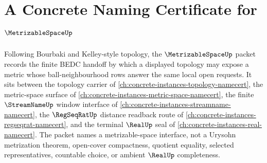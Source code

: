\chapter{A Concrete Naming Certificate for $\MetrizableSpaceUp$}
\label{ch:concrete-instances-metrizable-space-namecert}

Following Bourbaki and Kelley-style topology, the $\MetrizableSpaceUp$ packet records the finite BEDC handoff by which a displayed topology may expose a metric whose ball-neighbourhood rows answer the same local open requests. It sits between the topology carrier of \autoref{ch:concrete-instances-topology-namecert}, the metric-space surface of \autoref{ch:concrete-instances-metric-space-namecert}, the finite $\StreamNameUp$ window interface of \autoref{ch:concrete-instances-streamname-namecert}, the $\RegSeqRatUp$ distance readback route of \autoref{ch:concrete-instances-regseqrat-namecert}, and the terminal $\RealUp$ seal of \autoref{ch:concrete-instances-real-namecert}. The packet names a metrizable-space interface, not a Urysohn metrization theorem, open-cover compactness, quotient equality, selected representatives, countable choice, or ambient $\RealUp$ completeness.

